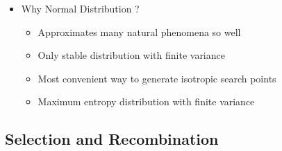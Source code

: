 \documentclass{book}
\begin{document}
\begin{itemize}
    \item Why Normal Distribution ?
    \begin{itemize}
        \item Approximates many natural phenomena so well
        \item Only stable distribution with finite variance
        \item Most convenient way to generate isotropic search points
        \item Maximum entropy distribution with finite variance
    \end{itemize}
\end{itemize}
\subsection{Selection and Recombination}
\end{document}
